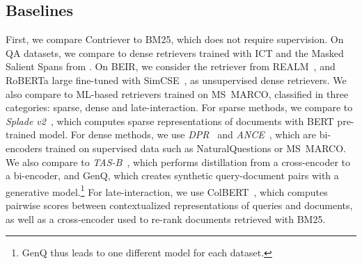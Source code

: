 \documentclass[10pt]{article} %
\def \ours          {Contriever}
\begin{document}
\subsection{Baselines}
First, we compare \ours{} to BM25, which does not require supervision.
On QA datasets, we compare to dense retrievers trained with ICT and the Masked Salient Spans from \citet{sachan2021endtoend}.
On BEIR, we consider the retriever from REALM~\citep{guu2020realm}, and RoBERTa large fine-tuned with SimCSE~\citep{gao2021simcse}, as unsupervised dense retrievers.
We also compare to ML-based retrievers trained on MS~MARCO, classified in three categories: sparse, dense and late-interaction.
For sparse methods, we compare to \emph{Splade v2}~\citep{formal2021splade}, which computes sparse representations of documents with BERT pre-trained model.
For dense methods, we use \emph{DPR}~\citep{karpukhin2020dense} and \emph{ANCE}~\citep{xiong2020approximate}, which are bi-encoders trained on supervised data such as NaturalQuestions or MS~MARCO.
We also compare to \emph{TAS-B}~\citep{hofstatter2021efficiently}, which performs distillation from a cross-encoder to a bi-encoder, and GenQ, which creates synthetic query-document pairs with a generative model.\footnote{GenQ thus leads to one different model for each dataset.}
For late-interaction, we use ColBERT~\citep{khattab2020relevanceguided}, which computes pairwise scores between contextualized representations of queries and documents, as well as a cross-encoder used to re-rank documents retrieved with BM25.

\end{document}
